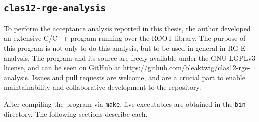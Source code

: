 \subsection{\texttt{clas12-rge-analysis}} \label{ssec::clas12rgeanalysis}
    To perform the acceptance analysis reported in this thesis, the author developed an extensive C/C++ program running over the ROOT library.
    The purpose of this program is not only to do this analysis, but to be used in general in RG-E analysis.
    The program and its source are freely available under the GNU LGPLv3 license, and can be seen on GitHub at \hyperlink{https://github.com/bleaktwig/clas12-rge-analysis}{https://github.com/bleaktwig/clas12-rge-analysis}.
    Issues and pull requests are welcome, and are a crucial part to enable maintainability and collaborative development to the repository.

    After compiling the program via \texttt{make}, five executables are obtained in the \texttt{bin} directory.
    The following sections describe each.

    
    
    
    
    
